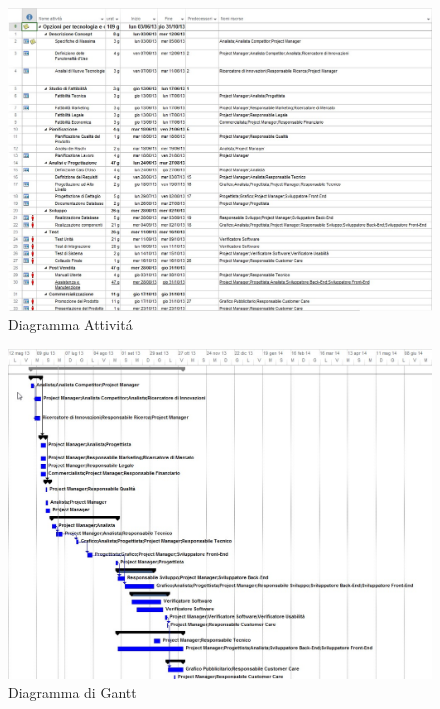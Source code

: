 \begin{figure}[H]
\begin{center}
\includegraphics[width=1\textwidth]{img/Attivita.jpg}
\caption{Diagramma  Attivit\'a}
\label{fig:Diagramma Attivit\'a}
\end{center}
\end{figure}
\begin{figure}[H]
\begin{center}
\includegraphics[width=1\textwidth]{img/Gantt.jpg}
\caption{Diagramma di Gantt}
\label{fig:Diagramma di Gantt}
\end{center}
\end{figure}
